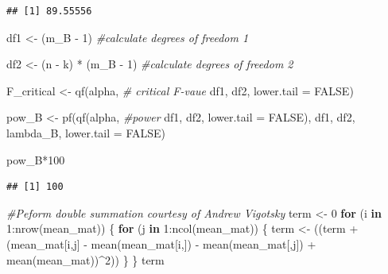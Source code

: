 \documentclass[
]{book}
\newenvironment{Shaded}{\begin{snugshade}}{\end{snugshade}}
\newcommand{\AttributeTok}[1]{\textcolor[rgb]{0.77,0.63,0.00}{#1}}
\newcommand{\CommentTok}[1]{\textcolor[rgb]{0.56,0.35,0.01}{\textit{#1}}}
\newcommand{\ConstantTok}[1]{\textcolor[rgb]{0.00,0.00,0.00}{#1}}
\newcommand{\ControlFlowTok}[1]{\textcolor[rgb]{0.13,0.29,0.53}{\textbf{#1}}}
\newcommand{\DecValTok}[1]{\textcolor[rgb]{0.00,0.00,0.81}{#1}}
\newcommand{\FunctionTok}[1]{\textcolor[rgb]{0.00,0.00,0.00}{#1}}
\newcommand{\NormalTok}[1]{#1}
\newcommand{\OtherTok}[1]{\textcolor[rgb]{0.56,0.35,0.01}{#1}}
\newcommand{\SpecialCharTok}[1]{\textcolor[rgb]{0.00,0.00,0.00}{#1}}
\begin{document}
\begin{verbatim}
## [1] 89.55556
\end{verbatim}

\begin{Shaded}
\begin{Highlighting}[]
\NormalTok{df1 }\OtherTok{\textless{}{-}}\NormalTok{ (m\_B }\SpecialCharTok{{-}} \DecValTok{1}\NormalTok{) }\CommentTok{\#calculate degrees of freedom 1}

\NormalTok{df2 }\OtherTok{\textless{}{-}}\NormalTok{ (n }\SpecialCharTok{{-}}\NormalTok{ k) }\SpecialCharTok{*}\NormalTok{ (m\_B }\SpecialCharTok{{-}} \DecValTok{1}\NormalTok{) }\CommentTok{\#calculate degrees of freedom 2}

\NormalTok{F\_critical }\OtherTok{\textless{}{-}} \FunctionTok{qf}\NormalTok{(alpha, }\CommentTok{\# critical F{-}vaue}
\NormalTok{                 df1,}
\NormalTok{                 df2,}
                 \AttributeTok{lower.tail =} \ConstantTok{FALSE}\NormalTok{) }

\NormalTok{pow\_B }\OtherTok{\textless{}{-}} \FunctionTok{pf}\NormalTok{(}\FunctionTok{qf}\NormalTok{(alpha, }\CommentTok{\#power }
\NormalTok{             df1, }
\NormalTok{             df2, }
             \AttributeTok{lower.tail =} \ConstantTok{FALSE}\NormalTok{), }
\NormalTok{          df1, }
\NormalTok{          df2, }
\NormalTok{          lambda\_B, }
          \AttributeTok{lower.tail =} \ConstantTok{FALSE}\NormalTok{)}


\NormalTok{pow\_B}\SpecialCharTok{*}\DecValTok{100}
\end{Highlighting}
\end{Shaded}

\begin{verbatim}
## [1] 100
\end{verbatim}

\begin{Shaded}
\begin{Highlighting}[]
\CommentTok{\#Peform double summation courtesy of Andrew Vigotsky}
\NormalTok{term }\OtherTok{\textless{}{-}} \DecValTok{0}
\ControlFlowTok{for}\NormalTok{ (i }\ControlFlowTok{in} \DecValTok{1}\SpecialCharTok{:}\FunctionTok{nrow}\NormalTok{(mean\_mat)) \{}
  \ControlFlowTok{for}\NormalTok{ (j }\ControlFlowTok{in} \DecValTok{1}\SpecialCharTok{:}\FunctionTok{ncol}\NormalTok{(mean\_mat)) \{}
\NormalTok{    term }\OtherTok{\textless{}{-}}\NormalTok{ ((term }\SpecialCharTok{+}\NormalTok{ (mean\_mat[i,j] }\SpecialCharTok{{-}}
                        \FunctionTok{mean}\NormalTok{(mean\_mat[i,]) }\SpecialCharTok{{-}} 
                        \FunctionTok{mean}\NormalTok{(mean\_mat[,j]) }\SpecialCharTok{+} \FunctionTok{mean}\NormalTok{(mean\_mat))}\SpecialCharTok{\^{}}\DecValTok{2}\NormalTok{))}
\NormalTok{  \}}
\NormalTok{\}}
\NormalTok{term}
\end{Highlighting}
\end{Shaded}
\end{document}

